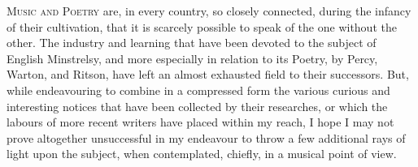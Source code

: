 \mainmatter
\vspace*{\baselineskip}

\thispagestyle{empty}

\vspace*{\baselineskip}


\textsc{Music and Poetry} are, in every country, so closely connected, during the 
infancy of their cultivation, that it is scarcely possible to speak of the one without
the other. The industry and learning that have been devoted to the subject of
English Minstrelsy, and more especially in relation to its Poetry, by Percy,
Warton, and Ritson, have left an almost exhausted field to their successors.
But, while endeavouring to combine in a compressed form the various curious
and interesting notices that have been collected by their researches, or which
the labours of more recent writers have placed within my reach, I hope I may
not prove altogether unsuccessful in my endeavour to throw a few additional rays
of light upon the subject, when contemplated, chiefly, in a musical point of view.

